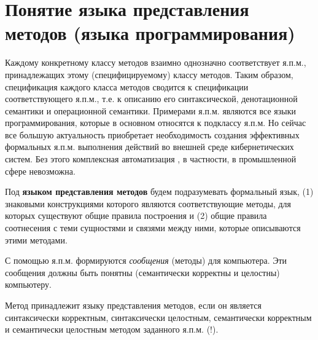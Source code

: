 \section{Понятие языка представления методов (языка программирования)}

Каждому конкретному классу методов взаимно однозначно соответствует я.п.м., принадлежащих этому (специфицируемому) классу методов. Таким образом, спецификация каждого класса методов сводится к спецификации соответствующего я.п.м., т.е. к описанию его синтаксической, денотационной семантики и операционной семантики. Примерами я.п.м. являются все языки программирования, которые в основном относятся к подклассу я.п.м. Но сейчас все большую актуальность приобретает необходимость создания эффективных формальных я.п.м. выполнения действий во внешней среде кибернетических систем. Без этого комплексная автоматизация \cite{Pospelov2021}, в частности, в промышленной сфере невозможна.

Под \textbf{языком представления методов} будем подразумевать формальный язык, (1) знаковыми конструкциями которого являются соответствующие методы, для которых существуют общие правила построения и (2) общие правила соотнесения с теми сущностями и связями между ними, которые описываются этими методами.

С помощью я.п.м. формируются \textit{сообщения} (методы) для компьютера. Эти сообщения должны быть понятны (семантически корректны и целостны) компьютеру.

\begin{SCn}
\begin{scnindent}
\end{scnindent}
\end{SCn}

Метод принадлежит языку представления методов, если он является синтаксически корректным, синтаксически целостным, семантически корректным и семантически целостным методом заданного я.п.м. (!).

